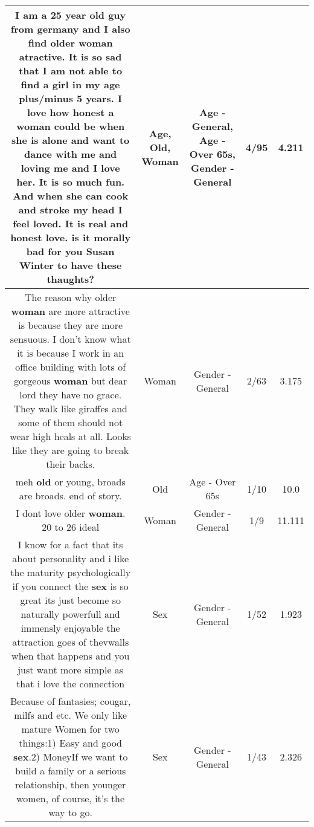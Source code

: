 \documentclass[11pt]{article}
\newlength\mylength
\begin{document}
\begin{center}
\begin{longtable}{|C{.65\mylength}|C{.30\mylength}|C{.12\mylength}|C{.12\mylength}|C{.12\mylength}|}
  \small I am a 25 year \textbf{old} guy from germany and I also find older \textbf{woman} atractive. It is so sad that I am not able to find a girl in my \textbf{age} plus/minus 5 years. I love how honest a \textbf{woman} could be when she is alone and want to dance with me and loving me and I love her. It is so much fun. And when she can cook and stroke my head I feel loved. It is real and honest love. is it morally bad for you Susan Winter to have these thaughts?\normalsize   & Age, Old, Woman & Age - General, Age - Over 65s, Gender - General & 4/95 & 4.211 \\  \hline
  \small The reason why older \textbf{woman} are more attractive is because they are more sensuous. I don't know what it is because I work in an office building with lots of gorgeous \textbf{woman} but dear lord they have no grace. They walk like giraffes and some of them should not wear high heals at all. Looks like they are going to break their backs.\normalsize   & Woman & Gender - General & 2/63 & 3.175 \\  \hline
  \small meh \textbf{old} or young, broads are broads. end of story.\normalsize   & Old & Age - Over 65s & 1/10 & 10.0 \\  \hline
  \small I dont love older \textbf{woman}. 20 to 26 ideal\normalsize   & Woman & Gender - General & 1/9 & 11.111 \\  \hline
  \small I know for a fact that its about personality and i like the maturity psychologically if you connect the \textbf{sex} is so great its just become so naturally powerfull and immensly enjoyable the attraction goes of thevwalls when that happens and you just want more simple as that i love the connection\normalsize   & Sex & Gender - General & 1/52 & 1.923 \\  \hline
  \small Because of fantasies; cougar, milfs and etc. We only like mature Women for two things:1) Easy and good \textbf{sex}.2) MoneyIf we want to build a family or a serious relationship, then younger women, of course, it's the way to go.\normalsize   & Sex & Gender - General & 1/43 & 2.326 \\  \hline

\end{longtable}
\end{center}
\end{document}
